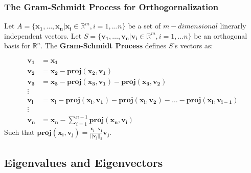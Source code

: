 \documentclass{article}
\begin{document}
\subsubsection{The Gram-Schmidt Process for Orthogornalization}

Let $A = \{\mathbf{x_1, \ldots, x_n} | \mathbf{x_i} \in \mathbb{R}^m, i = 1, \ldots n \}$ be a set of $m-dimensional$ linerarly independent vectors. Let $S = \{\mathbf{v_1, \ldots, v_n} | \mathbf{v_i} \in \mathbb{R}^m, i = 1, \ldots n \}$ be an orthogonal basis for $\mathbb{R}^n$. The \textbf{Gram-Schmidt Process} defines $S$'s vectors as:


\begin{align}
	\mathbf{v_1} &= \mathbf{x_1} \\
	\mathbf{v_2} & = \mathbf{x_2} - \mathbf{proj(x_2, v_1)} \\
	\mathbf{v_3} & = \mathbf{x_3} - \mathbf{proj(x_3, v_1)} -  \mathbf{proj(x_3, v_2)} \\
	\vdots & \\
	\mathbf{v_i} &= \mathbf{x_i} - \mathbf{proj(x_i, v_1)} -  \mathbf{proj(x_i, v_2)}  - \ldots - \mathbf{proj(x_i, v_{i - 1})} \\
	\vdots & \\
	\mathbf{v_n} &= \mathbf{x_n} -  \sum_{i = 1}^{n - 1} {\mathbf{proj(x_n, v_i)}} 
\end{align}
Such that  $ \mathbf{proj(x_i, v_j)}=  \frac{\mathbf{x_i \cdot v_j}}{||\mathbf{v_j}||_2}\mathbf{v_j}$.

\subsection{Eigenvalues and Eigenvectors}
\end{document}

